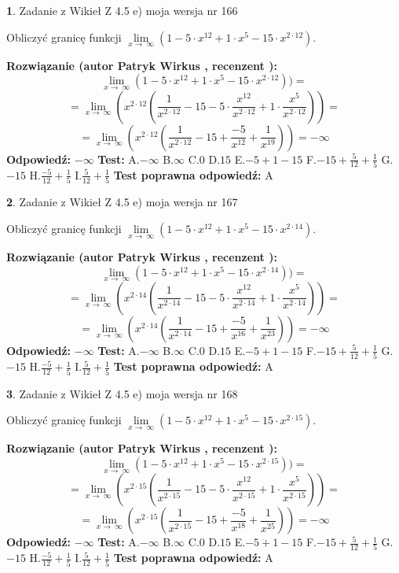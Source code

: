 \documentclass[12pt, a4paper]{article}
\theoremstyle{definition} %
\newtheorem{zad}{}
\newcommand{\zadStart}[1]{\begin{zad}#1\newline}
\newcommand{\zadStop}{\end{zad}}
\newcommand{\rozwStart}[2]{\noindent \textbf{Rozwiązanie (autor #1 , recenzent #2): }\newline}
\newcommand{\rozwStop}{\newline}
\newcommand{\odpStart}{\noindent \textbf{Odpowiedź:}\newline}
\newcommand{\odpStop}{\newline}
\newcommand{\testStart}{\noindent \textbf{Test:}\newline}
\newcommand{\testStop}{\newline}
\newcommand{\kluczStart}{\noindent \textbf{Test poprawna odpowiedź:}\newline}
\newcommand{\kluczStop}{\newline}
\begin{document}
\zadStart{Zadanie z Wikieł Z 4.5 e) moja wersja nr 166}



Obliczyć granicę funkcji  $\lim\limits_{x\to\ \infty}(1 - 5 \cdot x^{12}+1 \cdot x^{5}- 15 \cdot x^{2\cdot12})$.
\zadStop
\rozwStart{Patryk Wirkus}{}
$$\lim\limits_{x\to\ \infty}(1 - 5 \cdot x^{12}+1 \cdot x^{5}- 15 \cdot x^{2\cdot12}))=$$
$$=\lim\limits_{x\to\ \infty}(x^{2\cdot12}(\frac{1}{x^{2\cdot12}}-15 -5 \cdot \frac{x^{12}}{x^{2\cdot12}}+1 \cdot \frac{x^{5}}{x^{2\cdot12}}))=$$
$$=\lim\limits_{x\to\ \infty}(x^{2\cdot12}(\frac{1}{x^{2\cdot12}}-15 + \frac{-5}{x^{12}}+ \frac{1}{x^{19}}))=-\infty$$
\rozwStop
\odpStart
$-\infty$
\odpStop
\testStart
A.$-\infty$ B.$\infty$ C.$0$ D.$15$ E.$-5 + 1 - 15$
F.$-15+\frac{5}{12}+\frac{1}{5}$ G.$-15$
H.$\frac{-5}{12}+\frac{1}{5}$
I.$\frac{5}{12}+\frac{1}{5}$
\testStop
\kluczStart
A
\kluczStop



\zadStart{Zadanie z Wikieł Z 4.5 e) moja wersja nr 167}



Obliczyć granicę funkcji  $\lim\limits_{x\to\ \infty}(1 - 5 \cdot x^{12}+1 \cdot x^{5}- 15 \cdot x^{2\cdot14})$.
\zadStop
\rozwStart{Patryk Wirkus}{}
$$\lim\limits_{x\to\ \infty}(1 - 5 \cdot x^{12}+1 \cdot x^{5}- 15 \cdot x^{2\cdot14}))=$$
$$=\lim\limits_{x\to\ \infty}(x^{2\cdot14}(\frac{1}{x^{2\cdot14}}-15 -5 \cdot \frac{x^{12}}{x^{2\cdot14}}+1 \cdot \frac{x^{5}}{x^{2\cdot14}}))=$$
$$=\lim\limits_{x\to\ \infty}(x^{2\cdot14}(\frac{1}{x^{2\cdot14}}-15 + \frac{-5}{x^{16}}+ \frac{1}{x^{23}}))=-\infty$$
\rozwStop
\odpStart
$-\infty$
\odpStop
\testStart
A.$-\infty$ B.$\infty$ C.$0$ D.$15$ E.$-5 + 1 - 15$
F.$-15+\frac{5}{12}+\frac{1}{5}$ G.$-15$
H.$\frac{-5}{12}+\frac{1}{5}$
I.$\frac{5}{12}+\frac{1}{5}$
\testStop
\kluczStart
A
\kluczStop



\zadStart{Zadanie z Wikieł Z 4.5 e) moja wersja nr 168}



Obliczyć granicę funkcji  $\lim\limits_{x\to\ \infty}(1 - 5 \cdot x^{12}+1 \cdot x^{5}- 15 \cdot x^{2\cdot15})$.
\zadStop
\rozwStart{Patryk Wirkus}{}
$$\lim\limits_{x\to\ \infty}(1 - 5 \cdot x^{12}+1 \cdot x^{5}- 15 \cdot x^{2\cdot15}))=$$
$$=\lim\limits_{x\to\ \infty}(x^{2\cdot15}(\frac{1}{x^{2\cdot15}}-15 -5 \cdot \frac{x^{12}}{x^{2\cdot15}}+1 \cdot \frac{x^{5}}{x^{2\cdot15}}))=$$
$$=\lim\limits_{x\to\ \infty}(x^{2\cdot15}(\frac{1}{x^{2\cdot15}}-15 + \frac{-5}{x^{18}}+ \frac{1}{x^{25}}))=-\infty$$
\rozwStop
\odpStart
$-\infty$
\odpStop
\testStart
A.$-\infty$ B.$\infty$ C.$0$ D.$15$ E.$-5 + 1 - 15$
F.$-15+\frac{5}{12}+\frac{1}{5}$ G.$-15$
H.$\frac{-5}{12}+\frac{1}{5}$
I.$\frac{5}{12}+\frac{1}{5}$
\testStop
\kluczStart
A
\kluczStop
\end{document}
